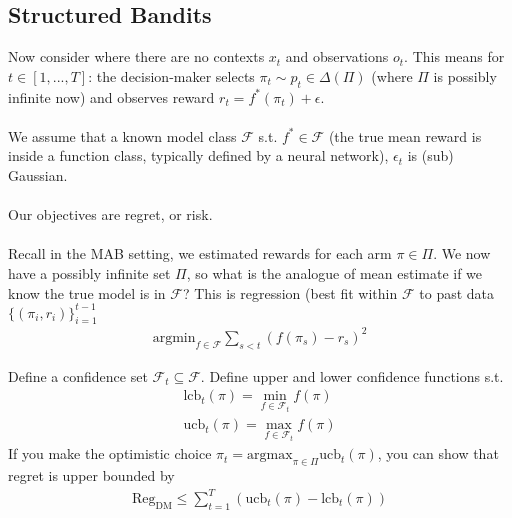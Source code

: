 \subsection{Structured Bandits}
Now consider where there are no contexts $x_t$ and observations $o_t$. This means for $t \in [1,...,T]$: the decision-maker selects $\pi_t \sim p_t \in \Delta(\Pi)$ (where $\Pi$ is possibly infinite now) and observes reward $r_t = f^*(\pi_t) + \epsilon$. \\
\\
We assume that a known model class $\mathcal F$ s.t. $f^* \in \mathcal F$ (the true mean reward is inside a function class, typically defined by a neural network), $\epsilon_t$ is (sub) Gaussian.\\
\\
Our objectives are regret, or risk.\\
\\
Recall in the MAB setting, we estimated rewards for each arm $\pi \in \Pi$. We now have a possibly infinite set $\Pi$, so what is the analogue of mean estimate if we know the true model is in $\mathcal F$? This is regression (best fit within $\mathcal F$ to past data $\{(\pi_i, r_i)\}_{i=1}^{t-1}$
\begin{align}
	\text{argmin}_{f\in \mathcal F} \sum_{s < t} (f(\pi_s) - r_s)^2
\end{align}
\begin{sidework}
	Define a confidence set $\mathcal F_t \subseteq \mathcal F$. Define upper and lower confidence functions s.t.
	\begin{align}
		\text{lcb}_t(\pi) = \min_{f \in \mathcal F_t} f(\pi)\\
		\text{ucb}_t(\pi) = \max_{f \in \mathcal F_t}f(\pi)
	\end{align}
	If you make the optimistic choice $\pi_t = \text{argmax
}_{\pi \in \Pi} \text{ucb}_t(\pi)$,	you can show that regret is upper bounded by
	\begin{align}
		\text{Reg}_{\text{DM}}\leq \sum_{t=1}^T (\text{ucb}_t(\pi) - \text{lcb}_t(\pi))
	\end{align}
\end{sidework}

